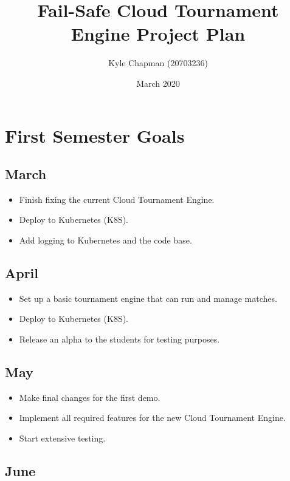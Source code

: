 \documentclass[a4paper, 12pt]{article}
\title{Fail-Safe Cloud Tournament Engine Project Plan}
\author{Kyle Chapman (20703236)}
\date{March 2020}
\begin{document}
\maketitle

\section{First Semester Goals}

\subsection{March}

\begin{itemize}
	\item Finish fixing the current Cloud Tournament Engine.
	\item Deploy to Kubernetes (K8S).
	\item Add logging to Kubernetes and the code base.
\end{itemize}

\subsection{April}

\begin{itemize}
	\item Set up a basic tournament engine that can run and manage matches.
	\item Deploy to Kubernetes (K8S).
	\item Release an alpha to the students for testing purposes.
\end{itemize}

\subsection{May}

\begin{itemize}
	\item Make final changes for the first demo.
	\item Implement all required features for the new Cloud Tournament Engine.
	\item Start extensive testing.
\end{itemize}

\subsection{June}
\end{document}

